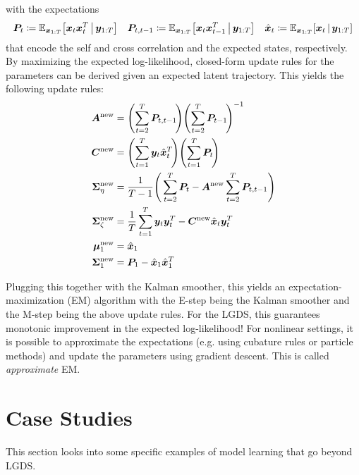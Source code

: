 			with the expectations
			\begin{align*}
				\bm{P}_t \coloneqq \mathbb{E}_{\bm{x}_{1:T}}\big[ \bm{x}_t \bm{x}_t^T \,\big\vert\, \bm{y}_{1:T} \big]
				 &  &
				\bm{P}_{t, t - 1} \coloneqq \mathbb{E}_{\bm{x}_{1:T}}\big[ \bm{x}_t \bm{x}_{t - 1}^T \,\big\vert\, \bm{y}_{1:T} \big]
				 &  &
				\hat{\bm{x}}_t \coloneqq \mathbb{E}_{\bm{x}_{1:T}}[ \bm{x}_t \,\vert\, \bm{y}_{1:T} ]
			\end{align*}
			that encode the self and cross correlation and the expected states, respectively. By maximizing the expected log-likelihood, closed-form update rules for the parameters can be derived given an expected latent trajectory. This yields the following update rules:
			\begin{align*}
				\mat{A}^\mathrm{new}            & = \Bigg(\! \sum_{t = 2}^{T} \mat{P}_{t, t - 1} \!\Bigg) \Bigg(\! \sum_{t = 2}^{T} \mat{P}_{t - 1} \!\Bigg)^{-1}       \\
				\mat{C}^\mathrm{new}            & = \Bigg(\! \sum_{t = 1}^{T} \vec{y}_t \hat{\vec{x}}_t^T \!\Bigg) \Bigg(\! \sum_{t = 1}^{T} \mat{P}_t \!\Bigg)         \\
				\mat{\Sigma}_\eta^\mathrm{new}  & = \frac{1}{T - 1} \Bigg( \sum_{t = 2}^{T} \mat{P}_t - \mat{A}^\mathrm{new} \sum_{t = 2}^{T} \mat{P}_{t, t - 1} \Bigg) \\
				\mat{\Sigma}_\zeta^\mathrm{new} & = \frac{1}{T} \sum_{t = 1}^{T} \vec{y}_t \vec{y}_t^T - \mat{C}^\mathrm{new} \hat{\vec{x}}_t \vec{y}_t^T               \\
				\vec{\mu}_1^\mathrm{new}        & = \hat{\vec{x}}_1                                                                                                     \\
				\mat{\Sigma}_1^\mathrm{new}     & = \mat{P}_1 - \hat{\vec{x}}_1 \hat{\vec{x}}_1^T
			\end{align*}

			Plugging this together with the Kalman smoother, this yields an expectation-maximization (EM) algorithm with the E-step being the Kalman smoother and the M-step being the above update rules. For the LGDS, this guarantees monotonic improvement in the expected log-likelihood! For nonlinear settings, it is possible to approximate the expectations (e.g. using cubature rules or particle methods) and update the parameters using gradient descent. This is called \emph{approximate} EM.

	\section{Case Studies}
		This section looks into some specific examples of model learning that go beyond LGDS.

